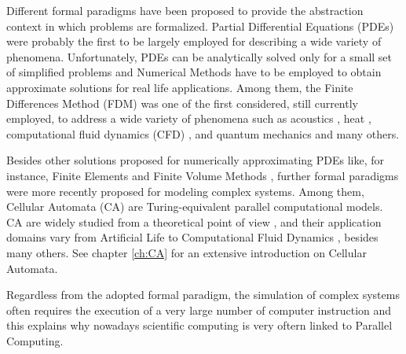    Different formal paradigms have been proposed to provide the
  abstraction context in which problems are formalized. Partial
  Differential Equations (PDEs) were probably the first to be largely
  employed for describing a wide variety of phenomena. Unfortunately,
  PDEs can be analytically solved only for a small set of simplified
  problems \cite{Mazumder20161} and Numerical Methods have to be
  employed to obtain approximate solutions for real life applications. Among
  them, the Finite Differences Method (FDM) was one of the first
  considered, still currently employed, to address a wide variety of
  phenomena such as acoustics \cite{Chaigne19941112, Branski2014},
  heat \cite{Rana2012212, Sahin200619}, computational fluid dynamics
  (CFD) \cite{Chang1990317, Deng201390}, and quantum mechanics
  \cite{Hu2015640, Farrokhabadi201467} and many others.
  
  
  
Besides other solutions proposed for numerically approximating PDEs
  like, for instance, Finite Elements \cite{Hutton:2003} and Finite Volume Methods \cite{Moukalled}, further formal paradigms were more recently proposed for modeling complex systems. Among them, Cellular Automata (CA) \cite{vonNeumann:1966:TSA:1102024} are Turing-equivalent \cite{Codd:1968:CA:1098682, Cook04a} parallel computational models. CA are widely studied from a theoretical point
  of view \cite{Wolfram-1984, Langton-1990b, Wolfram-2002,
    Ninagawa201542}, and their application domains vary from
  Artificial Life \cite{Langton-1986, Beer2004309} to Computational
  Fluid Dynamics \cite{Frish&al-1986, McNamara&Zanetti-1988,
    Higuera&Jimenez-1989, Aidun2010439}, besides many others. See chapter \ref{ch:CA} for an extensive introduction on Cellular Automata.
    
Regardless from the adopted formal paradigm, the simulation of
complex systems often requires the execution of a very large number of computer instruction and this explains why nowadays scientific computing is very oftern linked to  Parallel Computing. 

